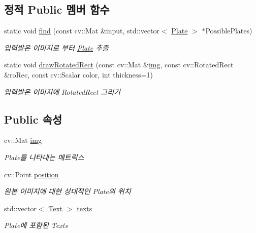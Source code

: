 \subsection*{정적 Public 멤버 함수}
\begin{DoxyCompactItemize}
\item 
static void \hyperlink{class_plate_a23487b8b0975634238eb338d994c9694}{find} (const cv\+::\+Mat \&input, std\+::vector$<$ \hyperlink{class_plate}{Plate} $>$ $\ast$Possible\+Plates)
\begin{DoxyCompactList}\small\item\em 입력받은 이미지로 부터 \hyperlink{class_plate}{Plate} 추출 \end{DoxyCompactList}\item 
static void \hyperlink{class_plate_a58655eea1f6d370b189c9e3b0509dba1}{draw\+Rotated\+Rect} (const cv\+::\+Mat \&\hyperlink{class_plate_a51ae6ecac15e4d8b6c8f6a1f6438e84b}{img}, const cv\+::\+Rotated\+Rect \&ro\+Rec, const cv\+::\+Scalar color, int thickness=1)
\begin{DoxyCompactList}\small\item\em 입력받은 이미지에 Rotated\+Rect 그리기 \end{DoxyCompactList}\end{DoxyCompactItemize}
\subsection*{Public 속성}
\begin{DoxyCompactItemize}
\item 
\mbox{\label{class_plate_a51ae6ecac15e4d8b6c8f6a1f6438e84b}} 
cv\+::\+Mat \hyperlink{class_plate_a51ae6ecac15e4d8b6c8f6a1f6438e84b}{img}
\begin{DoxyCompactList}\small\item\em Plate를 나타내는 매트릭스 \end{DoxyCompactList}\item 
\mbox{\label{class_plate_a9176604a4d578e74c085c6b77cef1fef}} 
cv\+::\+Point \hyperlink{class_plate_a9176604a4d578e74c085c6b77cef1fef}{position}
\begin{DoxyCompactList}\small\item\em 원본 이미지에 대한 상대적인 Plate의 위치 \end{DoxyCompactList}\item 
\mbox{\label{class_plate_a2f9fd5a829e54bfc844215d16bef1fe3}} 
std\+::vector$<$ \hyperlink{class_plate_1_1_text}{Text} $>$ \hyperlink{class_plate_a2f9fd5a829e54bfc844215d16bef1fe3}{texts}
\begin{DoxyCompactList}\small\item\em Plate에 포함된 Texts \end{DoxyCompactList}\end{DoxyCompactItemize}
